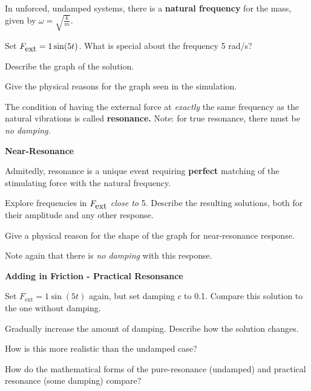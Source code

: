 In unforced, undamped systems, there is a {\bf natural frequency} for
the mass, given by $\omega = \sqrt{\frac{k}{m}}$.

\problem Set $F_{\mbox{ext}} = 1 \sin(5t)$.  What is special about the frequency
5 rad/s?

\vfill

Describe the graph of the solution.

\vfill

Give the physical reasons for the graph seen in the
simulation.\\

\vfill

The condition of having the external force at {\em exactly} the same
frequency as the natural vibrations is called {\bf resonance.}  Note:
for true resonance, there must be {\em no damping.}

\newpage

{\bf Near-Resonance}

Admitedly, resonance is a unique event requiring {\bf perfect}
matching of the stimulating force with the natural frequency.

\problem Explore frequencies in $F_{\mbox{ext}}$ {\em close to} 5.  Describe the
resulting solutions, both for their amplitude and any other response.

\vfill

Give a physical reason for the shape of the graph for near-resonance
response.

\vfill

Note again that there is {\em no damping} with this response.

\newpage


{\bf Adding in Friction - Practical Resonsance}

Set $F_{\mbox{ext}} = 1 \sin(5t)$ again, but set damping $c$ to 0.1.
\problem Compare this solution to the one without damping.

\vfill

Gradually increase the amount of damping.  Describe how the solution
changes.

\vfill

How is this more realistic than the undamped case?

\vfill

How do the mathematical forms of the pure-resonance (undamped) and
practical resonance (some damping) compare?

\vfill

